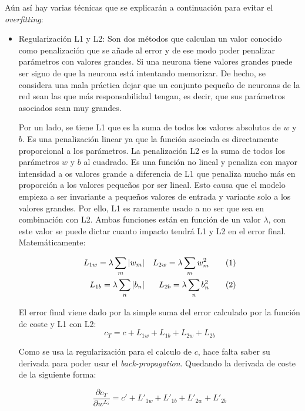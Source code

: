Aún así hay varias técnicas que se explicarán a continuación para evitar el \textit{overfitting}: 
\begin{itemize}
    \item Regularización L1 y L2:
    Son dos métodos que calculan un valor conocido como penalización que se añade al error y de ese modo poder penalizar parámetros con valores grandes. Si una neurona tiene valores grandes puede ser signo de que la neurona está intentando memorizar. De hecho, se considera una mala práctica dejar que un conjunto pequeño de neuronas de la red sean las que más responsabilidad tengan, es decir, que sus parámetros asociados sean muy grandes.
    \newline
    
    Por un lado, se tiene L1 que es la suma de todos los valores absolutos de $w$ y $b$. Es una penalización linear ya que la función asociada es directamente proporcional a los parámetros. La penalización L2 es la suma de todos los parámetros $w$ y $b$ al cuadrado. Es una función no lineal y penaliza con mayor intensidad a os valores grande a diferencia de L1 que penaliza mucho más en proporción a los valores pequeños por ser lineal. Esto causa que el modelo empieza a ser invariante a pequeños valores de entrada y variante solo a los valores grandes. Por ello, L1 es raramente usado a no ser que sea en combinación con L2. Ambas funciones están en función de un valor $\lambda$, con este valor se puede dictar cuanto impacto tendrá L1 y L2 en el error final. Matemáticamente:
    
    \begin{align*}
         L_{1w} = \lambda \sum_m |w_m| &&  L_{2w} = \lambda \sum_m w^2_m \addtocounter{equation}{1}\tag{\theequation} \\ 
         L_{1b} =\lambda \sum_n |b_n| && L_{2b} = \lambda \sum_n b^2_n \addtocounter{equation}{1}\tag{\theequation}
    \end{align*}
    

    El error final viene dado por la simple suma del error calculado por la función de coste y L1 con L2:
    \begin{equation}
        c_T = c + L_{1w} + L_{1b} + L_{2w} + L_{2b}
    \end{equation}
    
    Como se usa la regularización para el calculo de $c$, hace falta saber su derivada para poder usar el \textit{back-propagation}. Quedando la derivada de coste de la siguiente forma:
    
    \begin{equation}
        \frac{\partial c_T}{\partial w^{L_i}} = c' + L'_{1w} + L'_{1b} + L'_{2w} + L'_{2b}
    \end{equation}
    

\end{itemize}
